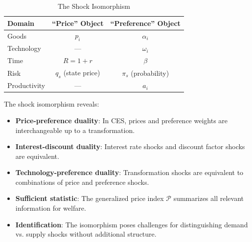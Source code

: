 \begin{table}[H]
\centering
\caption{The Shock Isomorphism}
\label{tab:ac-iso-summary}
\renewcommand{\arraystretch}{1.5}
\begin{tabular}{@{}lcc@{}}
\toprule
\textbf{Domain} & \textbf{``Price'' Object} & \textbf{``Preference'' Object} \\
\midrule
Goods & $p_i$ & $\alpha_i$ \\
Technology & --- & $\omega_i$ \\
Time & $R = 1 + r$ & $\beta$ \\
Risk & $q_s$ (state price) & $\pi_s$ (probability) \\
Productivity & --- & $a_i$ \\
\bottomrule
\end{tabular}
\end{table}

\begin{callouttip}
The shock isomorphism reveals:
\begin{itemize}[nosep]
\item \textbf{Price-preference duality}: In CES, prices and preference weights are interchangeable up to a transformation.
\item \textbf{Interest-discount duality}: Interest rate shocks and discount factor shocks are equivalent.
\item \textbf{Technology-preference duality}: Transformation shocks are equivalent to combinations of price and preference shocks.
\item \textbf{Sufficient statistic}: The generalized price index $\mathcal{P}$ summarizes all relevant information for welfare.
\item \textbf{Identification}: The isomorphism poses challenges for distinguishing demand vs. supply shocks without additional structure.
\end{itemize}
\end{callouttip}
